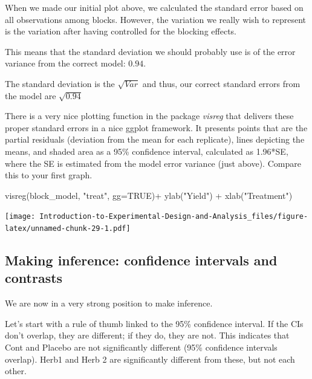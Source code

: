 \documentclass[
]{book}
\newenvironment{Shaded}{\begin{snugshade}}{\end{snugshade}}
\newcommand{\AttributeTok}[1]{\textcolor[rgb]{0.77,0.63,0.00}{#1}}
\newcommand{\ConstantTok}[1]{\textcolor[rgb]{0.00,0.00,0.00}{#1}}
\newcommand{\FunctionTok}[1]{\textcolor[rgb]{0.00,0.00,0.00}{#1}}
\newcommand{\NormalTok}[1]{#1}
\newcommand{\SpecialCharTok}[1]{\textcolor[rgb]{0.00,0.00,0.00}{#1}}
\newcommand{\StringTok}[1]{\textcolor[rgb]{0.31,0.60,0.02}{#1}}
\begin{document}
When we made our initial plot above, we calculated the standard error based on all observations among blocks. However, the variation we really wish to represent is the variation after having controlled for the blocking effects.

This means that the standard deviation we should probably use is of the error variance from the correct model: \(0.94\).

The standard deviation is the \(\sqrt{Var}\) and thus, our correct standard errors from the model are \(\sqrt{0.94}\)

There is a very nice plotting function in the package \emph{visreg} that delivers these proper standard errors in a nice ggplot framework. It presents points that are the partial residuals (deviation from the mean for each replicate), lines depicting the means, and shaded area as a 95\% confidence interval, calculated as 1.96*SE, where the SE is estimated from the model error variance (just above). Compare this to your first graph.

\begin{Shaded}
\begin{Highlighting}[]
\FunctionTok{visreg}\NormalTok{(block\_model, }\StringTok{"treat"}\NormalTok{, }\AttributeTok{gg=}\ConstantTok{TRUE}\NormalTok{)}\SpecialCharTok{+}
  \FunctionTok{ylab}\NormalTok{(}\StringTok{"Yield"}\NormalTok{) }\SpecialCharTok{+} 
  \FunctionTok{xlab}\NormalTok{(}\StringTok{"Treatment"}\NormalTok{) }
\end{Highlighting}
\end{Shaded}

\texttt{[image: Introduction-to-Experimental-Design-and-Analysis\_files/figure-latex/unnamed-chunk-29-1.pdf]}

\hypertarget{making-inference-confidence-intervals-and-contrasts}{%
\subsection{Making inference: confidence intervals and contrasts}\label{making-inference-confidence-intervals-and-contrasts}}

We are now in a very strong position to make inference.

Let's start with a rule of thumb linked to the 95\% confidence interval. If the CIs don't overlap, they are different; if they do, they are not. This indicates that Cont and Placebo are not significantly different (95\% confidence intervals overlap). Herb1 and Herb 2 are significantly different from these, but not each other.
\end{document}
